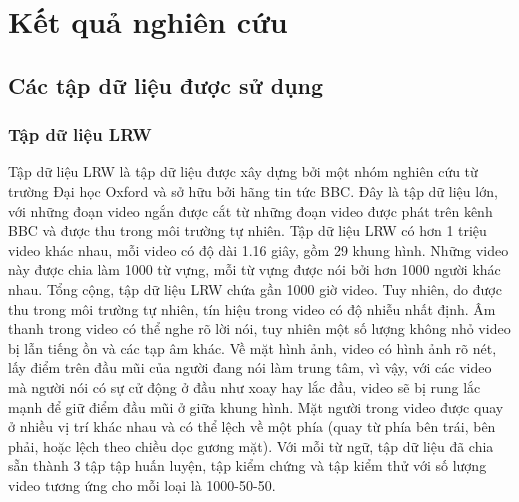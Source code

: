 \chapter{Kết quả nghiên cứu}

\section{Các tập dữ liệu được sử dụng}
\subsection{Tập dữ liệu LRW \cite{lrw}}

Tập dữ liệu LRW là tập dữ liệu được xây dựng bởi một nhóm nghiên cứu từ trường Đại học Oxford và sở hữu bởi hãng tin tức BBC. Đây là tập dữ liệu lớn, với những đoạn video ngắn được cắt từ những đoạn video được phát trên kênh BBC và được thu trong môi trường tự nhiên. Tập dữ liệu LRW có hơn 1 triệu video khác nhau, mỗi video có độ dài 1.16 giây, gồm 29 khung hình. Những video này được chia làm 1000 từ vựng, mỗi từ vựng được nói bởi hơn 1000 người khác nhau. Tổng cộng, tập dữ liệu LRW chứa gần 1000 giờ video. Tuy nhiên, do được thu trong môi trường tự nhiên, tín hiệu trong video có độ nhiễu nhất định. Âm thanh trong video có thể nghe rõ lời nói, tuy nhiên một số lượng không nhỏ video bị lẫn tiếng ồn và các tạp âm khác. Về mặt hình ảnh, video có hình ảnh rõ nét, lấy điểm trên đầu mũi của người đang nói làm trung tâm, vì vậy, với các video mà người nói có sự cử động ở đầu như xoay hay lắc đầu, video sẽ bị rung lắc mạnh để giữ điểm đầu mũi ở giữa khung hình. Mặt người trong video được quay ở nhiều vị trí khác nhau và có thể lệch về một phía (quay từ phía bên trái, bên phải, hoặc lệch theo chiều dọc gương mặt). Với mỗi từ ngữ, tập dữ liệu đã chia sẵn thành 3 tập tập huấn luyện, tập kiểm chứng và tập kiểm thử với số lượng video tương ứng cho mỗi loại là 1000-50-50.

